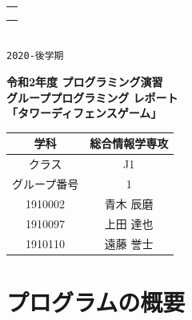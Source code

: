 \documentclass[11pt,a4j]{jarticle}
\begin{document}
\thispagestyle{empty}
\begin{flushright}
    \begin{tabular}{|c|}\hline
        \hspace*{2cm}   \\
        \hspace*{2cm}   \\
        \hspace*{1.7cm} \\ \hline
    \end{tabular}\\
    {\huge\tt 2020-後学期}
\end{flushright}
\begin{center}
    \begin{Huge}
        {\bf 令和2年度 プログラミング演習}\\
        \vspace{0.5cm}
        {\bf グループプログラミング レポート}\\
        \vspace{1.5cm}
        {\bf 「タワーディフェンスゲーム」}\\
        \vspace{5cm}

        \begin{tabular}{|c|c|}\hline
            学科         & 総合情報学専攻 \\ \hline
            クラス       & J1             \\ \hline
            グループ番号 & 1              \\ \hline
            1910002      & 青木 辰磨      \\ \hline
            1910097      & 上田 達也      \\ \hline
            1910110      & 遠藤 誉士      \\ \hline
        \end{tabular}
    \end{Huge}
\end{center}
\newpage

\section{プログラムの概要}

\end{document}
